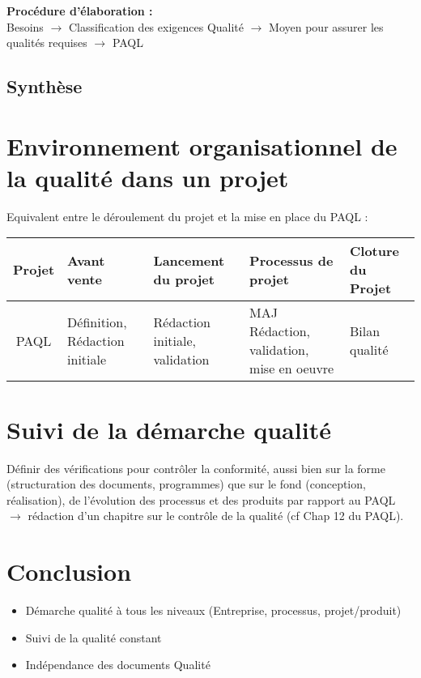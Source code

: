 \begin{description}
\textbf{Procédure d’élaboration :}\hfill\\
	Besoins $\rightarrow$ Classification des exigences Qualité $\rightarrow$ Moyen pour assurer les qualités requises $\rightarrow$ PAQL

	\subsection{Synthèse}
	
\section{Environnement organisationnel de la qualité dans un projet}


Equivalent entre le déroulement du projet et la mise en place du PAQL :\\

\begin{tabular}{|c|p{3cm}|p{3cm}|p{3cm}|p{3cm}|}
\hline
Projet & Avant vente & Lancement du projet & Processus de projet & Cloture du Projet\\
\hline
PAQL & Définition, Rédaction initiale & Rédaction initiale, validation & MAJ Rédaction, validation, mise en oeuvre & Bilan qualité\\
\hline
\end{tabular}

\section{Suivi de la démarche qualité}

Définir des vérifications pour contrôler la conformité, aussi bien sur la forme (structuration des documents, programmes) que sur le fond (conception, réalisation), de l’évolution des processus et des produits par rapport au PAQL $\rightarrow$ rédaction d’un chapitre sur le contrôle de la qualité (cf Chap 12 du PAQL).

\section{Conclusion}

\begin{itemize}
\item Démarche qualité à tous les niveaux (Entreprise, processus, projet/produit)
\item Suivi de la qualité constant
\item Indépendance des documents Qualité
\end{itemize}


\end{description}
